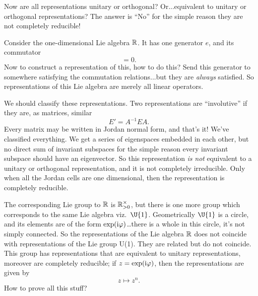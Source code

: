 Now are all representations unitary or orthogonal?
Or...equivalent to unitary or orthogonal representations? The
answer is ``No'' for the simple reason they are not completely
reducible!
\begin{ex}
Consider the one-dimensional Lie algebra $\Bbb{R}$. It has one
generator $e$, and its commutator
\begin{equation}
[e,e] = 0.
\end{equation}
Now to construct a representation of this, how to do this? Send
this generator to somewhere satisfying the commutation
relations...but they are \emph{always} satisfied. So
representations of this Lie algebra are merely all linear operators.
\end{ex}
We should classify these representations. Two representations are
``involutive'' if they are, as matrices, similar
\begin{equation}
E' = A^{-1}EA.
\end{equation}
Every matrix may be written in Jordan normal form, and that's it!
We've classified everything. We get a series of eigenspaces
embedded in each other, but no direct sum of invariant subspaces
for the simple reason every invariant subspace should have an
eigenvector. So this representation \emph{is not} equivalent to a
unitary or orthogonal representation, and it is not completely
irreducible. Only when all the Jordan cells are one dimensional,
then the representation is completely reducible.

The corresponding Lie group to $\Bbb{R}$ is
$\Bbb{R}^{\times}_{>0}$, but there is one more group which
corresponds to the same Lie algebra viz.\ $\U{1}$. Geometrically $\U{1}$
is a circle, and its elements are of the form
$\exp(\mathrm{i}\varphi)$\dots there is a whole in this circle, it's not
simply connected. So the representations of the Lie algebra
$\Bbb{R}$ does not coincide with representations of the Lie group
U(1). They are related but do not coincide. This group has
representations that are equivalent to unitary representations,
moreover are completely reducible; if $z=\exp(\mathrm{i}\varphi)$, then
the representations are given by
\begin{equation}
z\mapsto z^{n}.
\end{equation}
How to prove all this stuff?

